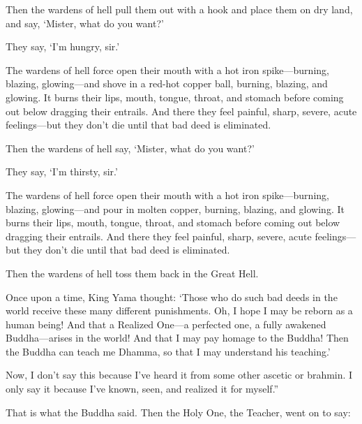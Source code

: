 \documentclass[12pt,openany]{book}%
\begin{document}
Then the wardens of hell pull them out with a hook and place them on dry land, and say, ‘Mister, what do you want?’ 

They say, ‘I’m hungry, sir.’ 

The wardens of hell force open their mouth with a hot iron spike—burning, blazing, glowing—and shove in a red-hot copper ball, burning, blazing, and glowing. It burns their lips, mouth, tongue, throat, and stomach before coming out below dragging their entrails. And there they feel painful, sharp, severe, acute feelings—but they don’t die until that bad deed is eliminated. 

Then the wardens of hell say, ‘Mister, what do you want?’ 

They say, ‘I’m thirsty, sir.’ 

The wardens of hell force open their mouth with a hot iron spike—burning, blazing, glowing—and pour in molten copper, burning, blazing, and glowing. It burns their lips, mouth, tongue, throat, and stomach before coming out below dragging their entrails. And there they feel painful, sharp, severe, acute feelings—but they don’t die until that bad deed is eliminated. 

Then the wardens of hell toss them back in the Great Hell. 

Once upon a time, King Yama thought: ‘Those who do such bad deeds in the world receive these many different punishments. Oh, I hope I may be reborn as a human being! And that a Realized One—a perfected one, a fully awakened Buddha—arises in the world! And that I may pay homage to the Buddha! Then the Buddha can teach me Dhamma, so that I may understand his teaching.’ 

Now, I don’t say this because I’ve heard it from some other ascetic or brahmin. I only say it because I’ve known, seen, and realized it for myself.” 

That is what the Buddha said. Then the Holy One, the Teacher, went on to say: 
\end{document}
